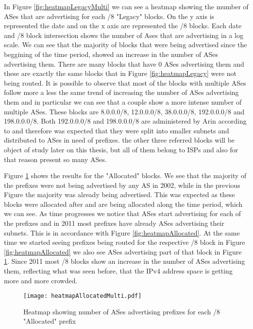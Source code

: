 \documentclass[11pt,a4paper]{scrreprt}
\begin{document}
In Figure \ref{fig:heatmapLegacyMulti} we can see a heatmap showing the mumber of ASes that are advertising for each /8 "Legacy" blocks. On the y axis is represented the date and on the x axis are represented the /8 blocks. Each date and /8 block intersection shows the number of Ases that are advertising in a log scale. 
We can see that the majority of blocks that were being advertised since the beggining of the time period, showed an increase in the number of ASes advertising them. There are many blocks that have 0 ASes advertising them and these are exactly the same blocks that in Figure \ref{fig:heatmapLegacy} were not being routed. It is possible to observe that most of the blocks with multiple ASes follow more a less the same trend of increasing the number of ASes advertising them and in particular we can see that a couple show a more intense number of multiple ASes. These blocks are 8.0.0.0/8, 12.0.0.0/8, 38.0.0.0/8, 192.0.0.0/8 and 198.0.0.0/8. Both 192.0.0.0/8 and 198.0.0.0/8 are administered by Arin according to \cite{IANA_Address_Space} and therefore was expected that they were split into smaller subnets and distributed to ASes in need of prefixes. the other three referred blocks will be object of study later on this thesis, but all of them belong to ISPs and also for that reason present so many ASes.

Figure \ref{fig:heatmapAllocatedMulti} shows the results for the "Allocated" blocks. 
We see that the majority of the prefixes were not being advertised by any AS in 2002, while in the previous Figure the majority was already being advertised. This was expected as these blocks were allocated after and are being allocated along the time period, which we can see. As time progresses we notice that ASes start advertising for each of the prefixes and in 2011 most prefixes have already ASes advertising their subnets. This is in accordance with Figure \ref{fig:heatmapAllocated}. At the same time we started seeing prefixes being routed for the respective /8 block in Figure \ref{fig:heatmapAllocated} we also see ASes advertising part of that block in Figure \ref{fig:heatmapAllocatedMulti}. Since 2011 most /8 blocks show an increase in the number of ASes advertising them, reflecting what was seen before, that the IPv4 address space is getting more and more crowded.

\begin{figure}[!h]
\centering
\texttt{[image: heatmapAllocatedMulti.pdf]}
\caption{Heatmap showing number of ASes advertising prefixes for each /8 "Allocated" prefix}
\label{fig:heatmapAllocatedMulti}
\end{figure}
\end{document}
